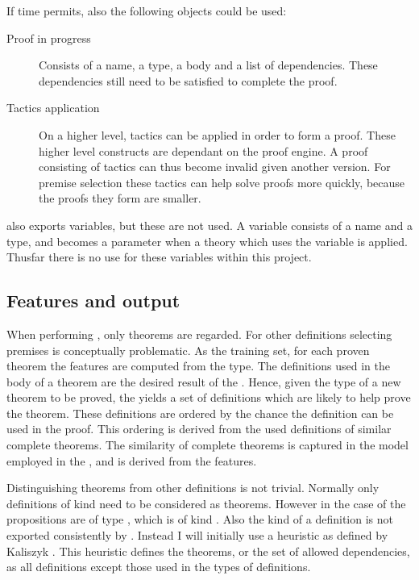 If time permits, also the following objects could be used:
\begin{description}
    \item[Proof in progress]
        Consists of a name, a type, a body and a list of dependencies.
        These dependencies still need to be satisfied to complete the proof.
    \item[Tactics application]
        On a higher level, tactics can be applied in order to form a proof.
        These higher level constructs are dependant on the proof engine.
        A proof consisting of tactics can thus become invalid given another \coq version.
        For premise selection these tactics can help solve proofs more quickly, because the proofs they form are smaller.
\end{description}

\coq also exports variables, but these are not used.
A variable consists of a name and a type, and becomes a parameter when a theory which uses the variable is applied.
Thusfar there is no use for these variables within this project.

\subsection{Features and output}
\label{section:features}
When performing \premiseselection, only theorems are regarded.
For other definitions selecting premises is conceptually problematic.
As the training set, for each proven theorem the features are computed from the type.
The definitions used in the body of a theorem are the desired result of the \premiseselection.
Hence, given the type of a new theorem to be proved, the \premiseselection yields a set of definitions which are likely to help prove the theorem.
These definitions are ordered by the chance the definition can be used in the proof.
This ordering is derived from the used definitions of similar complete theorems.
The similarity of complete theorems is captured in the model employed in the \premiseselection, and is derived from the features.

Distinguishing theorems from other definitions is not trivial.
Normally only definitions of kind \prop need to be considered as theorems.
However in the case of \corn the propositions are of type \cprop, which is of kind \kindtype.
Also the kind of a definition is not exported consistently by \coq.
Instead I will initially use a heuristic as defined by Kaliszyk \cite{kaliszyk2014machine}.
This heuristic defines the theorems, or the set of allowed dependencies, as all definitions except those used in the types of definitions.

